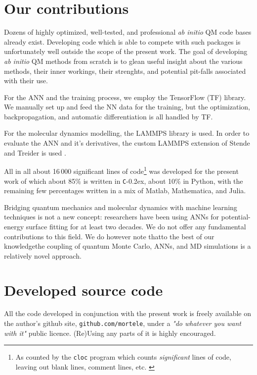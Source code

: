\documentclass[twoside,english]{uiofysmaster}
\newcommand{\inlinecc}[1]{\lstinline[language={[std]c++}]{#1}}
\newcommand*\CC{\texttt{C}\kern-0.2ex\raisebox{0.2ex}{\scalebox{0.9}{+\kern-0.2ex+}}}
\begin{document}
\section{Our contributions}
Dozens of highly optimized, well-tested, and professional \emph{ab initio} QM code bases already exist. Developing code which is able to compete with such packages is unfortunately well outside the scope of the present work. The goal of developing \emph{ab initio} QM methods from scratch is to glean useful insight about the various methods, their inner workings, their strenghts, and potential pit-falls associated with their use.
 
For the ANN and the training process, we employ the TensorFlow (TF) library. We manually set up and feed the NN data for the training, but the optimization, backpropagation, and automatic differentiation is all handled by TF.

For the molecular dynamics modelling, the LAMMPS library is used. In order to evaluate the ANN and it's derivatives, the custom LAMMPS extension of Stende and Treider is used \cite{stende,treider}. 

All in all about 16\,000 significant lines of code\footnote{As counted by the \lstinline{cloc} program which counts \emph{significant} lines of code, leaving out blank lines, comment lines, etc. \cite{cloc}} was developed for the present work of which about 85\% is written in \CC{}, about 10\% in Python, with the remaining few percentages written in a mix of {\sc Matlab}, Mathematica, and Julia. 

Bridging quantum mechanics and molecular dynamics with machine learning techniques is not a new concept: researchers have been using ANNs for potential-energy surface fitting for at least two decades. We do not offer any fundamental contributions to this field. We do however note that\textemdash to the best of our knowledge\textemdash the coupling of quantum Monte Carlo, ANNs, and MD simulations is a relatively novel approach. 

\section{Developed source code}
All the code developed in conjunction with the present work is freely available on the author's github site, \inlinecc{github.com/mortele}, under a \emph{"do whatever you want with it"} public licence. (Re)Using any parts of it is highly encouraged.
\end{document}
